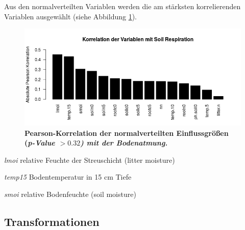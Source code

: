 Aus den normalverteilten Variablen werden die am stärksten korrelierenden Variablen ausgewählt (siehe Abbildung \ref{fig:pearson}). 

\begin{figure}
	\centering
	\includegraphics[width=\textwidth]{fig/model/correlation-pearson-normal.png}
	\caption{\bf{Pearson-Korrelation} der normalverteilten Einflussgrößen (\it{p-Value} $> 0.32$) mit der Bodenatmung.}
    \label{fig:pearson}
\end{figure}

\begin{compactitem}
\item
  \emph{lmoi} relative Feuchte der Streuschicht (litter moisture)
\item
  \emph{temp15} Bodentemperatur in 15 cm Tiefe
\item
  \emph{smoi} relative Bodenfeuchte (soil moisture)
\end{compactitem}

\subsection{Transformationen}

